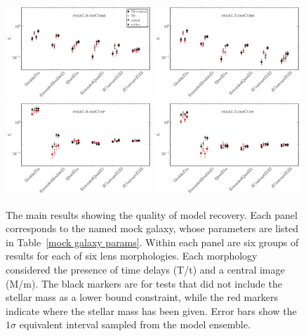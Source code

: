 \documentclass[galley,usenatbib]{mn2e}
\newcommand{\tabref}[1] {Table~\ref{#1}}
\begin{document}
\begin{figure}
\includegraphics[width=0.49\textwidth]{AAferror_profile-1sig.pdf}
\includegraphics[width=0.49\textwidth]{BBferror_profile-1sig.pdf}\\
\includegraphics[width=0.49\textwidth]{ACferror_profile-1sig.pdf}
\includegraphics[width=0.49\textwidth]{BCferror_profile-1sig.pdf}
\caption{The main results showing the quality of model recovery. Each panel corresponds to 
the named mock galaxy, whose parameters are listed in \tabref{mock galaxy params}. Within
each panel are six groups of results for each of six lens morphologies. Each morphology
considered the presence of time delays (T/t) and a central image (M/m). The black markers are for tests
that did not include the stellar mass as a lower bound constraint, while the red markers
indicate where the stellar mass has been given. Error bars show the $1\sigma$ equivalent interval sampled from the model ensemble.}
\label{main results}
\end{figure}
\end{document}
